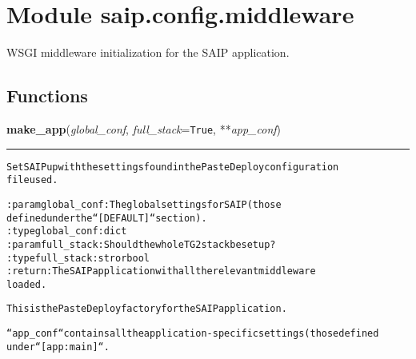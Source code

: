 %
%
%


\section{Module saip.config.middleware}

    \label{saip:config:middleware}
WSGI middleware initialization for the SAIP application.



  \subsection{Functions}

    \label{saip:config:middleware:make_app}

    \vspace{0.5ex}

\hspace{.8\funcindent}\begin{boxedminipage}{\funcwidth}

    \raggedright \textbf{make\_app}(\textit{global\_conf}, \textit{full\_stack}={\tt True}, **\textit{app\_conf})

    \vspace{-1.5ex}

    \rule{\textwidth}{0.5\fboxrule}
\setlength{\parskip}{2ex}
\begin{alltt}

Set SAIP up with the settings found in the PasteDeploy configuration
file used.

:param global\_conf: The global settings for SAIP (those
    defined under the ``[DEFAULT]`` section).
:type global\_conf: dict
:param full\_stack: Should the whole TG2 stack be set up?
:type full\_stack: str or bool
:return: The SAIP application with all the relevant middleware
    loaded.

This is the PasteDeploy factory for the SAIP application.

``app\_conf`` contains all the application-specific settings (those defined
under ``[app:main]``.
\end{alltt}

\setlength{\parskip}{1ex}
    \end{boxedminipage}

